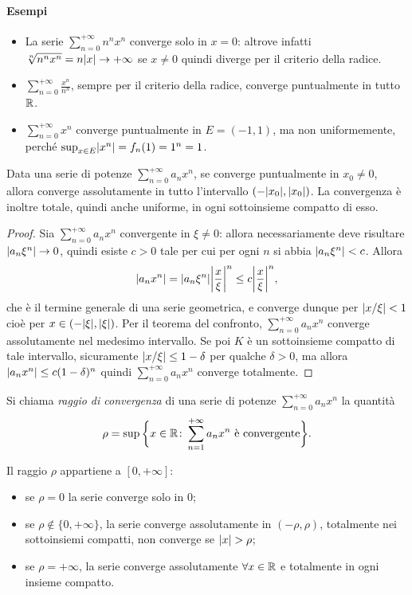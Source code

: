 \paragraph{Esempi}
\begin{itemize}
\item La serie $\sum_{n=0}^{+\infty}n^nx^n$ converge solo in $x=0$: altrove infatti $\sqrt[n]{n^nx^n}=n\abs{x}\to+\infty$ se $x\neq 0$ quindi diverge per il criterio della radice.
\item $\sum_{n=0}^{+\infty}\frac{x^n}{n^n}$, sempre per il criterio della radice, converge puntualmente in tutto $\R$.
\item $\sum_{n=0}^{+\infty}x^n$ converge puntualmente in $E=(-1,1)$, ma non uniformemente, perché $\sup_{x\in E}\abs{x^n}=f_n(1)=1^n=1$.
\end{itemize}
\begin{teorema}
Data una serie di potenze $\sum_{n=0}^{+\infty}a_nx^n$, se converge puntualmente in $x_0\neq 0$, allora converge assolutamente in tutto l'intervallo $(-\abs{x_0},\abs{x_0})$. La convergenza è inoltre totale, quindi anche uniforme, in ogni sottoinsieme compatto di esso.
\end{teorema}
\begin{proof}
Sia $\sum_{n=0}^{+\infty}a_nx^n$ convergente in $\xi\neq 0$: allora necessariamente deve risultare $\abs{a_n\xi^n}\to 0$, quindi esiste $c>0$ tale per cui per ogni $n$ si abbia $\abs{a_n\xi^n}<c$. Allora
\[
	\abs{a_nx^n}=\abs{a_n\xi^n}\abs[\bigg]{\frac{x}{\xi}}^n\leq c\abs[\bigg]{\frac{x}{\xi}}^n,
\]
che è il termine generale di una serie geometrica, e converge dunque per $\abs{x/\xi}<1$ cioè per $x\in(-\abs{\xi},\abs{\xi})$. Per il teorema del confronto, $\sum_{n=0}^{+\infty}a_nx^n$ converge assolutamente nel medesimo intervallo.
Se poi $K$ è un sottoinsieme compatto di tale intervallo, sicuramente $\abs{x/\xi}\leq 1-\delta$ per qualche $\delta>0$, ma allora $\abs{a_nx^n}\leq c(1-\delta)^n$ quindi $\sum_{n=0}^{+\infty}a_nx^n$ converge totalmente.
\end{proof}
\begin{definizione}
Si chiama \emph{raggio di convergenza} di una serie di potenze $\sum_{n=0}^{+\infty}a_nx^n$ la quantità
\[
\rho=\sup\bigg\{x\in\R\colon\sum_{n=1}^{+\infty}a_nx^n\text{ è convergente}\bigg\}.
\]
\end{definizione}
Il raggio $\rho$ appartiene a $[0,+\infty]$:
\begin{itemize}
\item se $\rho=0$ la serie converge solo in 0;
\item se $\rho\notin\{0,+\infty\}$, la serie converge assolutamente in $(-\rho,\rho)$, totalmente nei sottoinsiemi compatti, non converge se $\abs{x}>\rho$;
\item se $\rho=+\infty$, la serie converge assolutamente $\forall x\in\R$ e totalmente in ogni insieme compatto.
\end{itemize}
